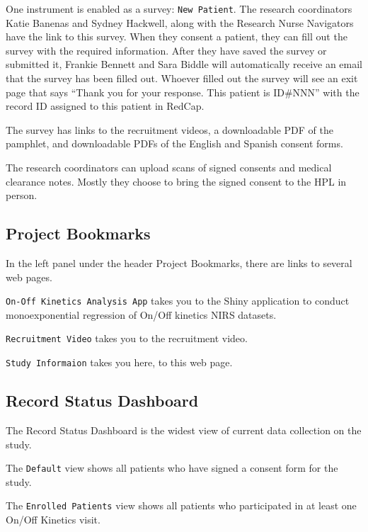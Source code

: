 \documentclass[
]{book}
\begin{document}
One instrument is enabled as a survey: \texttt{New\ Patient}. The research coordinators Katie Banenas and Sydney Hackwell, along with the Research Nurse Navigators have the link to this survey. When they consent a patient, they can fill out the survey with the required information. After they have saved the survey or submitted it, Frankie Bennett and Sara Biddle will automatically receive an email that the survey has been filled out. Whoever filled out the survey will see an exit page that says ``Thank you for your response. This patient is ID\#NNN'' with the record ID assigned to this patient in RedCap.

The survey has links to the recruitment videos, a downloadable PDF of the pamphlet, and downloadable PDFs of the English and Spanish consent forms.

The research coordinators can upload scans of signed consents and medical clearance notes. Mostly they choose to bring the signed consent to the HPL in person.

\hypertarget{RedCap-Bookmarks}{%
\subsection{Project Bookmarks}\label{RedCap-Bookmarks}}

In the left panel under the header Project Bookmarks, there are links to several web pages.

\texttt{On-Off\ Kinetics\ Analysis\ App} takes you to the Shiny application to conduct monoexponential regression of On/Off kinetics NIRS datasets.

\texttt{Recruitment\ Video} takes you to the recruitment video.

\texttt{Study\ Informaion} takes you here, to this web page.

\hypertarget{RedCap-Record-Status-Dashboard}{%
\subsection{Record Status Dashboard}\label{RedCap-Record-Status-Dashboard}}

The Record Status Dashboard is the widest view of current data collection on the study.

The \texttt{Default} view shows all patients who have signed a consent form for the study.

The \texttt{Enrolled\ Patients} view shows all patients who participated in at least one On/Off Kinetics visit.
\end{document}
